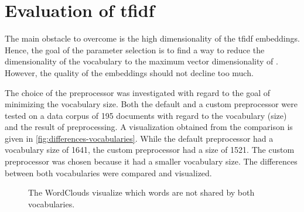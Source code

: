 \section{Evaluation of \acs{tfidf}}\label{sec:evaluation-tfidf}

The main obstacle to overcome is the high dimensionality of the \ac{tfidf} embeddings.
Hence, the goal of the parameter selection is to find a way to reduce the dimensionality of the vocabulary to the maximum vector dimensionality of \databaseName{}.
However, the quality of the embeddings should not decline too much.

The choice of the preprocessor was investigated with regard to the goal of minimizing the vocabulary size.
Both the default and a custom preprocessor were tested on a data corpus of 195 documents with regard to the vocabulary (size) and the result of preprocessing.
A visualization obtained from the comparison is given in \autoref{fig:differences-vocabularies}.
While the default preprocessor had a vocabulary size of 1641, the custom preprocessor had a size of 1521.
The custom preprocessor was chosen because it had a smaller vocabulary size.
The differences between both vocabularies were compared and visualized.

\begin{figure}%
    \centering
    \qquad
    \caption{The WordClouds visualize which words are not shared by both vocabularies.}%
    \label{fig:differences-vocabularies}%
\end{figure}

